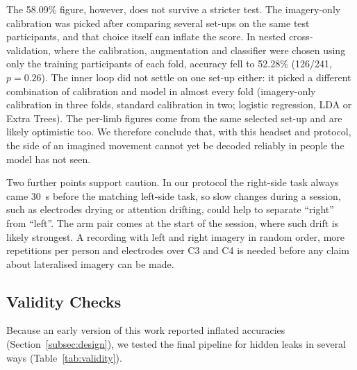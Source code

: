 \documentclass[pdflatex,sn-mathphys-num]{sn-jnl}%
\theoremstyle{thmstyleone}%
\theoremstyle{thmstyletwo}%
\theoremstyle{thmstylethree}%
\begin{document}
The 58.09\% figure, however, does not survive a stricter test. The imagery-only calibration was picked after comparing several set-ups on the same test participants, and that choice itself can inflate the score. In nested cross-validation, where the calibration, augmentation and classifier were chosen using only the training participants of each fold, accuracy fell to 52.28\% (126/241, $p = 0.26$). The inner loop did not settle on one set-up either: it picked a different combination of calibration and model in almost every fold (imagery-only calibration in three folds, standard calibration in two; logistic regression, LDA or Extra Trees). The per-limb figures come from the same selected set-up and are likely optimistic too. We therefore conclude that, with this headset and protocol, the side of an imagined movement cannot yet be decoded reliably in people the model has not seen.

Two further points support caution. In our protocol the right-side task always came 30~s before the matching left-side task, so slow changes during a session, such as electrodes drying or attention drifting, could help to separate ``right'' from ``left''. The arm pair comes at the start of the session, where such drift is likely strongest. A recording with left and right imagery in random order, more repetitions per person and electrodes over C3 and C4 is needed before any claim about lateralised imagery can be made.

\subsection{Validity Checks}\label{subsec:validity}

Because an early version of this work reported inflated accuracies (Section~\ref{subsec:design}), we tested the final pipeline for hidden leaks in several ways (Table~\ref{tab:validity}).
\end{document}
